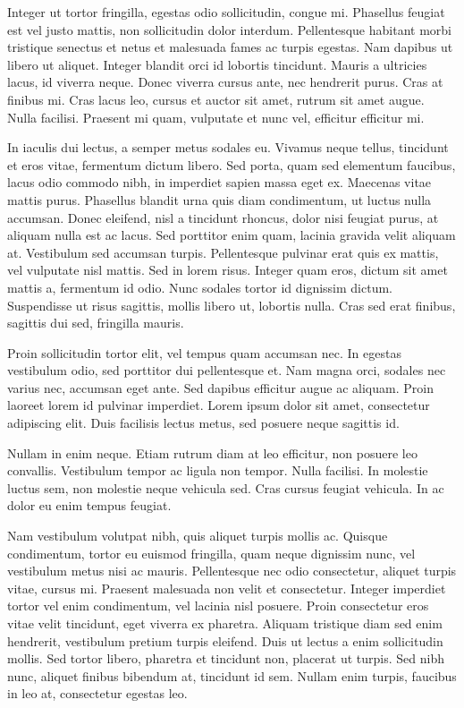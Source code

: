 Integer ut tortor fringilla, egestas odio sollicitudin, congue mi. Phasellus
feugiat est vel justo mattis, non sollicitudin dolor interdum. Pellentesque
habitant morbi tristique senectus et netus et malesuada fames ac turpis
egestas. Nam dapibus ut libero ut aliquet. Integer blandit orci id lobortis
tincidunt. Mauris a ultricies lacus, id viverra neque. Donec viverra cursus
ante, nec hendrerit purus. Cras at finibus mi. Cras lacus leo, cursus et auctor
sit amet, rutrum sit amet augue. Nulla facilisi. Praesent mi quam, vulputate et
nunc vel, efficitur efficitur mi.

In iaculis dui lectus, a semper metus sodales eu. Vivamus neque tellus,
tincidunt et eros vitae, fermentum dictum libero. Sed porta, quam sed elementum
faucibus, lacus odio commodo nibh, in imperdiet sapien massa eget ex. Maecenas
vitae mattis purus. Phasellus blandit urna quis diam condimentum, ut luctus
nulla accumsan. Donec eleifend, nisl a tincidunt rhoncus, dolor nisi feugiat
purus, at aliquam nulla est ac lacus. Sed porttitor enim quam, lacinia gravida
velit aliquam at. Vestibulum sed accumsan turpis. Pellentesque pulvinar erat
quis ex mattis, vel vulputate nisl mattis. Sed in lorem risus. Integer quam
eros, dictum sit amet mattis a, fermentum id odio. Nunc sodales tortor id
dignissim dictum. Suspendisse ut risus sagittis, mollis libero ut, lobortis
nulla. Cras sed erat finibus, sagittis dui sed, fringilla mauris.

Proin sollicitudin tortor elit, vel tempus quam accumsan nec. In egestas
vestibulum odio, sed porttitor dui pellentesque et. Nam magna orci, sodales nec
varius nec, accumsan eget ante. Sed dapibus efficitur augue ac aliquam. Proin
laoreet lorem id pulvinar imperdiet. Lorem ipsum dolor sit amet, consectetur
adipiscing elit. Duis facilisis lectus metus, sed posuere neque sagittis id.

Nullam in enim neque. Etiam rutrum diam at leo efficitur, non posuere leo
convallis. Vestibulum tempor ac ligula non tempor. Nulla facilisi. In molestie
luctus sem, non molestie neque vehicula sed. Cras cursus feugiat vehicula. In ac
dolor eu enim tempus feugiat.

Nam vestibulum volutpat nibh, quis aliquet turpis mollis ac. Quisque
condimentum, tortor eu euismod fringilla, quam neque dignissim nunc, vel
vestibulum metus nisi ac mauris. Pellentesque nec odio consectetur, aliquet
turpis vitae, cursus mi. Praesent malesuada non velit et consectetur. Integer
imperdiet tortor vel enim condimentum, vel lacinia nisl posuere. Proin
consectetur eros vitae velit tincidunt, eget viverra ex pharetra. Aliquam
tristique diam sed enim hendrerit, vestibulum pretium turpis eleifend. Duis ut
lectus a enim sollicitudin mollis. Sed tortor libero, pharetra et tincidunt non,
placerat ut turpis. Sed nibh nunc, aliquet finibus bibendum at, tincidunt id
sem. Nullam enim turpis, faucibus in leo at, consectetur egestas leo.

